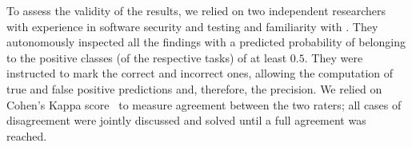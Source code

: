 To assess the validity of the results, we relied on two independent researchers with experience in software security and testing and familiarity with \VulforJ.
They autonomously inspected all the findings with a predicted probability of belonging to the positive classes (of the respective tasks) of at least $0.5$.
They were instructed to mark the correct and incorrect ones, allowing the computation of true and false positive predictions and, therefore, the precision.
We relied on Cohen's Kappa score~\cite{cohen:1960:kappa,McHugh:2012:cohen} to measure agreement between the two raters; all cases of disagreement were jointly discussed and solved until a full agreement was reached.


